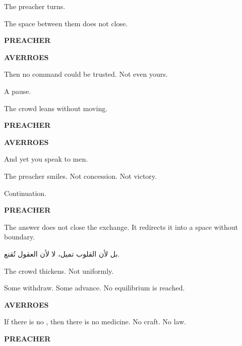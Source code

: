 \medskip

The preacher turns.

The space between them does not close.

\medskip

\textbf{PREACHER}


\medskip

\textbf{AVERROES}

Then no command could be trusted. Not even yours.

\medskip

A pause.

The crowd leans without moving.

\medskip

\textbf{PREACHER}


\medskip

\textbf{AVERROES}

And yet you speak to men.

\medskip

The preacher smiles. Not concession. Not victory.

Continuation.

\medskip

\textbf{PREACHER}


\medskip

The answer does not close the exchange. It redirects it into a space without
boundary.

\medskip

\begin{AR}
بل لأن القلوب تميل، لا لأن العقول تُقنع.
\end{AR}

\medskip

The crowd thickens. Not uniformly.

Some withdraw. Some advance. No equilibrium is reached.

\medskip

\textbf{AVERROES}

If there is no , then there is no medicine. No craft. No law.

\medskip

\textbf{PREACHER}


\medskip


